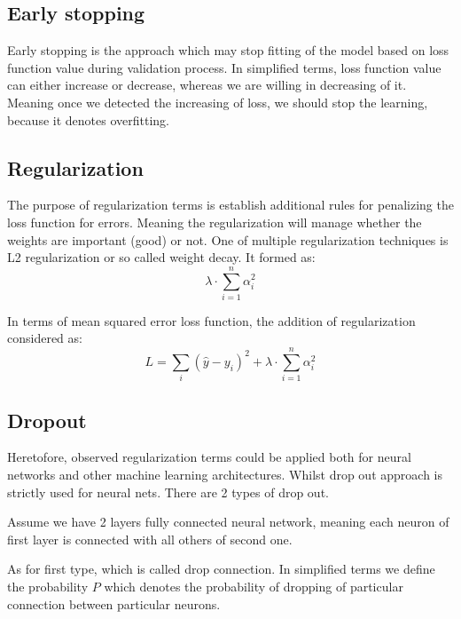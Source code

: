 \subsection{Early stopping}
Early stopping is the approach which may stop fitting of the model based on loss function value during validation process. In simplified terms, loss function value can either increase or decrease, whereas we are willing in decreasing of it. Meaning once we detected the increasing of loss, we should stop the learning, because it denotes overfitting.      

\subsection{Regularization}
The purpose of regularization terms is establish additional rules for penalizing the loss function for errors. Meaning the regularization will manage whether the weights are important (good) or not. One of multiple regularization techniques is L2 regularization or so called weight decay. It formed as:
\[ \lambda \cdot \sum_{i=1}^{n} \alpha_i^2 \]

In terms of mean squared error loss function, the addition of regularization considered as:
\[ L = \sum_{i}(\hat{y}-y_i)^2 + \lambda \cdot \sum_{i=1}^{n} \alpha_i^2\]

\subsection{Dropout}
Heretofore, observed regularization terms could be applied both for neural networks and other machine learning architectures. Whilst drop out approach is strictly used for neural nets. There are 2 types of drop out. 

Assume we have 2 layers fully connected neural network, meaning each neuron of first layer is connected with all others of second one. 

As for first type, which is called drop connection. In simplified terms we define the probability $P$ which denotes the probability of dropping of particular connection between particular neurons.  

